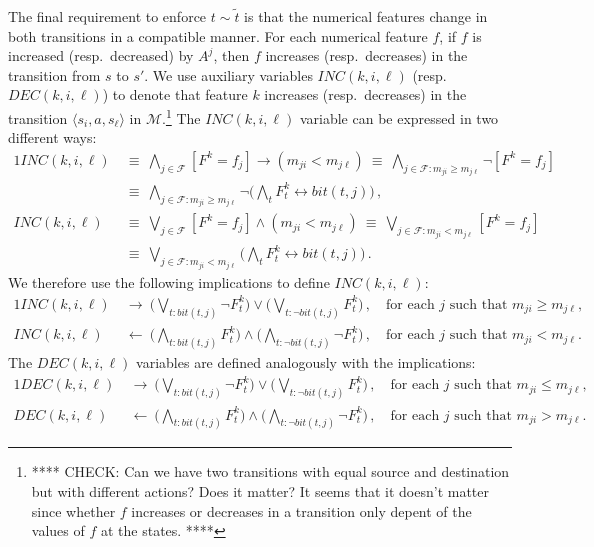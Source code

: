 \documentclass[10pt]{article}
\newcommand{\tup}[1]{\langle #1 \rangle}
\newcommand{\F}{\mathcal{F}}
\newcommand{\M}{\mathcal{M}}
\begin{document}
The final requirement to enforce $t\sim\tilde t$ is that the numerical features
change in both transitions in a compatible manner. For each numerical feature $f$,
if $f$ is increased (resp.\ decreased) by $A^j$, then $f$ increases (resp.\ decreases)
in the transition from $s$ to $s'$. We use auxiliary variables $INC(k,i,\ell)$
(resp.\ $DEC(k,i,\ell)$) to denote that feature $k$ increases (resp.\ decreases)
in the transition $\tup{s_i,a,s_\ell}$ in $\M$.\footnote{**** CHECK: Can we have
  two transitions with equal source and destination but with different actions?
  Does it matter? It seems that it doesn't matter since whether $f$ increases
  or decreases in a transition only depent of the values of $f$ at the states.
  ****}
The $INC(k,i,\ell)$ variable can be expressed in two different ways:
\begin{alignat}{1}
  INC(k,i,\ell)\ &\equiv\ \bigwedge_{j\in\F} [F^k = f_j] \rightarrow (m_{ji} < m_{j\ell})\
                  \equiv\ \bigwedge_{j\in\F:m_{ji}\geq m_{j\ell}} \neg [F^k = f_j] \\
                 &\equiv\ \bigwedge_{j\in\F:m_{ji}\geq m_{j\ell}} \neg \biggl(\bigwedge_t F^k_t \leftrightarrow bit(t,j)\biggr) \,, \\
  INC(k,i,\ell)\ &\equiv\ \bigvee_{j\in\F} [F^k = f_j] \land (m_{ji} < m_{j\ell})\
                  \equiv\ \bigvee_{j\in\F:m_{ji}<m_{j\ell}} [F^k = f_j] \\
                 &\equiv\ \bigvee_{j\in\F:m_{ji}<m_{j\ell}} \biggl(\bigwedge_t F^k_t \leftrightarrow bit(t,j)\biggr) \,.
\end{alignat}
We therefore use the following implications to define $INC(k,i,\ell)$:
\begin{alignat}{1}
  INC(k,i,\ell)\ &\rightarrow\ \biggl(\bigvee_{t:bit(t,j)} \neg F^k_t\biggr) \lor \biggl(\bigvee_{t:\neg bit(t,j)} F^k_t\biggr) \,,
                 \quad \text{for each $j$ such that $m_{ji} \geq m_{j\ell}$,} \\
  INC(k,i,\ell)\ &\leftarrow\  \biggl(\bigwedge_{t:bit(t,j)} F^k_t\biggr) \land \biggl(\bigwedge_{t:\neg bit(t,j)} \neg F^k_t\biggr) \,,
                 \quad \text{for each $j$ such that $m_{ji} < m_{j\ell}$.}
\end{alignat}
The $DEC(k,i,\ell)$ variables are defined analogously with the implications:
\begin{alignat}{1}
  DEC(k,i,\ell)\ &\rightarrow\ \biggl(\bigvee_{t:bit(t,j)} \neg F^k_t\biggr) \lor \biggl(\bigvee_{t:\neg bit(t,j)} F^k_t\biggr) \,,
                 \quad \text{for each $j$ such that $m_{ji} \leq m_{j\ell}$,} \\
  DEC(k,i,\ell)\ &\leftarrow\  \biggl(\bigwedge_{t:bit(t,j)} F^k_t\biggr) \land \biggl(\bigwedge_{t:\neg bit(t,j)} \neg F^k_t\biggr) \,,
                 \quad \text{for each $j$ such that $m_{ji} > m_{j\ell}$.}
\end{alignat}
\end{document}
